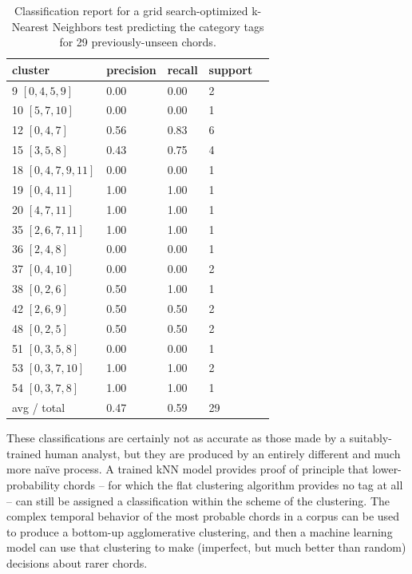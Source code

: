 \begin{table}%
  \caption{Classification report for a grid search-optimized k-Nearest Neighbors test predicting the category tags for 29 previously-unseen chords.}
  \centering
\begin{tabular}{l |l |l |l |l}
\hline\hline
cluster & precision	&  recall &  support \\ [0.5ex]
\hline
	 9 $[0,4,5,9]$	    &    0.00  &    0.00   &       2\\
	 10 $[5,7,10]$  	&    0.00  &    0.00   &       1\\
	 12 $[0,4,7]$		&    0.56  &    0.83   &       6\\
	 15 $[3,5,8]$ 		&    0.43  &    0.75   &       4\\
	 18 $[0,4,7,9,11]$  &    0.00  &    0.00   &       1\\
	 19 $[0,4,11]$		&    1.00  &    1.00   &       1\\
	 20 $[4,7,11]$		&    1.00  &    1.00   &       1\\
	 35 $[2,6,7,11]$	&    1.00  &    1.00   &       1\\
	 36 $[2,4,8]$		&    0.00  &    0.00   &       1\\
	 37 $[0,4,10]$	    &    0.00  &    0.00   &       2\\
	 38 $[0,2,6]$	    &    0.50  &    1.00   &       1\\
	 42 $[2,6,9]$	    &    0.50  &    0.50   &       2\\
	 48 $[0,2,5]$	    &    0.50  &    0.50   &       2\\
	 51 $[0,3,5,8]$	    &    0.00  &    0.00   &       1\\
	 53 $[0,3,7,10]$    &    1.00  &    1.00   &       2\\
	 54 $[0,3,7,8]$	    &    1.00  &    1.00   &       1\\
\hline
avg / total  &  0.47   &  0.59   &       29\\[1ex]
\hline
\end{tabular}
\label{class_report}
\end{table}

These classifications are certainly not as accurate as those made by a suitably-trained human analyst, but they are produced by an entirely different and much more na\"{i}ve process.  A trained kNN model provides proof of principle that lower-probability chords -- for which the flat clustering algorithm provides no tag at all -- can still be assigned a classification within the scheme of the clustering.  The complex temporal behavior of the most probable chords in a corpus can be used to produce a bottom-up agglomerative clustering, and then a machine learning model can use that clustering to make (imperfect, but much better than random) decisions about rarer chords.

